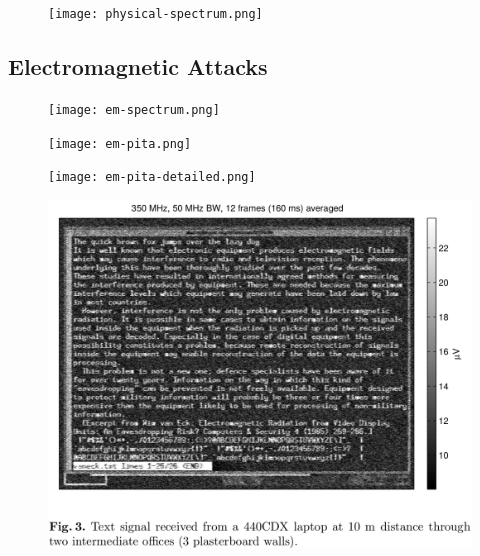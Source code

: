 \begin{frame}
  \begin{figure}
    \texttt{[image: physical-spectrum.png]}
  \end{figure}
\end{frame}

\subsection{Electromagnetic Attacks}

\begin{frame}
  \begin{figure}
    \texttt{[image: em-spectrum.png]}
  \end{figure}
\end{frame}

\begin{frame}
  \begin{figure}
    \texttt{[image: em-pita.png]}
  \end{figure}
\end{frame}

\begin{frame}
  \begin{figure}
    \texttt{[image: em-pita-detailed.png]}
  \end{figure}
\end{frame}

\begin{frame}
  \begin{figure}
    \includegraphics[height=0.9\textheight]{em-laptop.png}
  \end{figure}
\end{frame}

